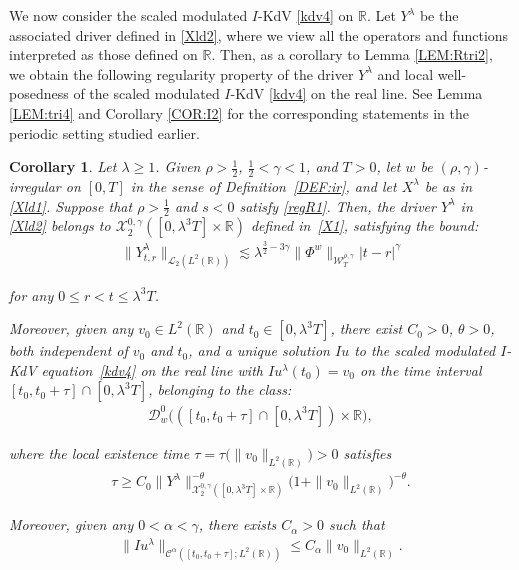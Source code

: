 \documentclass[letterpaper, 11pt,  reqno]{amsart}
\newtheorem{corollary}[theorem]{Corollary}
\newcommand{\1}{\hspace{0.5mm}\text{I}\hspace{0.5mm}}
\newcommand{\noi}{\noindent}
\newcommand{\R}{\mathbb{R}}
\newcommand{\CC}{\mathcal{C}}
\newcommand{\al}{\alpha}
\newcommand{\g}{\gamma}
\newcommand{\ld}{\lambda}
\newcommand{\ta}{\theta}
\newcommand{\les}{\lesssim}
\newcommand{\cL}{\mathcal{L}}
\newcommand{\cX}{\mathcal{X}}
\newcommand{\cD}{\mathscr{D}}
\newcommand{\W}{\mathcal{W}}
\numberwithin{equation}{section}
\numberwithin{theorem}{section}
\begin{document}
We now consider the 
 scaled modulated $I$-KdV \eqref{kdv4}
 on $\R$.
Let $Y^\ld$ be the associated
driver
defined in \eqref{Xld2}, 
where we view all the operators and functions 
interpreted as those defined on $\R$.
Then, 
as a corollary to 
Lemma \ref{LEM:Rtri2}, we obtain the following 
regularity property
of the driver $Y^\ld$
and local well-posedness of 
the  scaled modulated $I$-KdV \eqref{kdv4}
on the real line.
See
 Lemma \ref{LEM:tri4}
and Corollary \ref{COR:I2}
for the corresponding statements
in the periodic setting
studied earlier.





\begin{corollary}
\label{COR:RI1}
Let $\ld \ge 1$.
Given $\rho > \frac 12$, $\frac 12 < \g < 1$, and $T> 0$, 
let  $w$ be $(\rho,\g)$-irregular on $[0, T]$ in the sense of Definition~\ref{DEF:ir}, 
and let $X^\ld$ be as in \eqref{Xld1}.
Suppose that $\rho >  \frac 12$ and $s <  0$
satisfy 
\eqref{regR1}.
Then, 
the driver $Y^\ld$  in \eqref{Xld2}
belongs to $  \cX^{0, \g}_2([0, \ld^3T] \times \R)$ defined in~\eqref{X1}, 
satisfying the bound\textup{:}
\begin{align}
 \| Y^{\ld}_{t,r}  \|_{\cL_2 ( L^2(\R)) }
 \les
 \ld^{ \frac32  -3\g} 
  \|\Phi^{w}\|_{\W_{T}^{\rho, \g}}
 |t-r|^{\g}
\label{RW1}
\end{align}


\noi
for any $0\leq r<t \leq \ld^3T$.


Moreover, given any 
$v_0 \in L^2(\R)$ and  $t_0 \in [0, \ld^3 T]$, 
there exist $C_0 > 0$, $\ta > 0$, both independent of $v_0$ and $t_0$, 
and a unique solution $Iu$
to 
the scaled modulated $I$-KdV equation~\eqref{kdv4} 
on the real line
with $I u^\ld (t_0)= v_0$
on the time interval $[t_0, t_0 + \tau]\cap [0, \ld^3 T]$,  
belonging to the class\textup{:}
\begin{align*}
 \cD_{w}^0\big( ([t_0, t_0 + \tau] \cap [0, \ld^3 T]) \times \R\big), 
\end{align*}


\noi
where the local existence time 
$\tau = \tau \big(\| v_0 \|_{L^2(\R)}\big)> 0$ satisfies
\begin{align*}
\tau  \ge C_0 \|Y^\ld\|_{\cX^{0,\g}_2([0, \ld^3 T]\times \R)}^{-\ta} \big( 1 + \| v_0 \|_{L^2(\R)}\big)^{-\ta}.
\end{align*}

\noi
Moreover, given any $0 < \al < \g$, 
there exists $C_\al > 0$ such that 
\begin{align*}
 \| Iu^\ld \|_{\CC^\al ([t_0, t_0 + \tau];L^2(\R))}\le C_\al \|v_0\|_{L^2(\R)}.
\end{align*}





\end{corollary}
\end{document}
